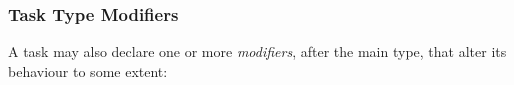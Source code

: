 \documentclass[11pt,a4paper]{article}
\begin{document}
\begin{itemize}
 
\end{itemize}


\subsubsection{Task Type Modifiers} 

A task may also declare one or more {\em modifiers}, after the main
type, that alter its behaviour to some extent:
\end{document}
